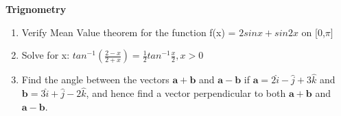 \documentclass[12pt,-letter paper]{article}
\theoremstyle{remark}
\let\vec\mathbf
\begin{document}
								  \begin{center}
								      \textbf{\fontsize{16}{16}\selectfont Trignometry}
								          \end{center}
									      \begin{enumerate}
									          \item Verify Mean Value theorem for the function f(x) =  $2sinx + sin2x $ on [0,$\pi]$
										      
										      \item Solve for x: $tan^{-1}(\frac{2-x}{2+x}) = \frac{1}{2} tan^{-1}\frac{x}{2},x>0$
										      \item Find the angle between the vectors $\vec{a}+\vec{b}$ and $\vec{a}-\vec{b}$ if $\vec{a} = 2\hat{i}-\hat{j}+3\hat{k}$ and $\vec{b} = 3\hat{i}+\hat{j}-2\hat{k}$, and hence find a vector perpendicular to both $\vec{a}+\vec{b}$ and $\vec{a}-\vec{b}$.

										       \end{enumerate}
										       
\end{document}
